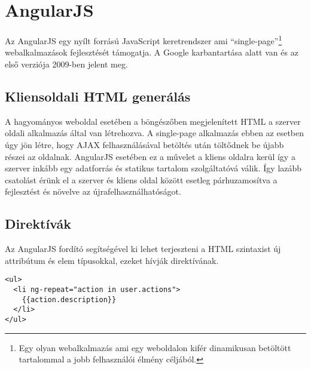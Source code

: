 \section{AngularJS}




Az AngularJS egy nyílt forrású JavaScript keretrendszer ami ``single-page''\footnote{Egy olyan webalkalmazás ami egy weboldalon kifér dinamikusan betöltött tartalommal a jobb felhasználói élmény céljából.} webalkalmazások fejlesztését támogatja. A Google karbantartása alatt van és az első verziója 2009-ben jelent meg. 

\subsection{Kliensoldali HTML generálás}


A hagyományos weboldal esetében a böngészőben megjelenített HTML a szerver oldali alkalmazás által van létrehozva.  A single-page alkalmazás ebben az esetben úgy jön létre, hogy AJAX felhasználásával betöltés után töltődnek be újabb részei az oldalnak\cite{angularbook}. AngularJS esetében ez a művelet a kliens oldalra kerül így a szerver inkább egy adatforrás és statikus tartalom szolgáltatóvá válik. Így lazább csatolást érünk el a szerver és kliens oldal között esetleg párhuzamosítva a fejlesztést és növelve az újrafelhasználhatóságot\cite{AngularDocConcepts}.





\subsection{Direktívák}

Az AngularJS fordító segítségével ki lehet terjeszteni a HTML szintaxist új attribútum és elem típusokkal, ezeket hívják direktívának. 

\lstset{language=HTML}
\begin{lstlisting}[frame=single]  
<ul>
  <li ng-repeat="action in user.actions">
    {{action.description}}
  </li>
</ul>
\end{lstlisting}

